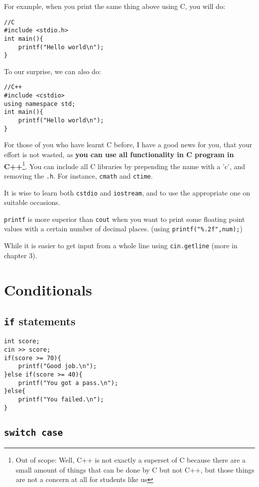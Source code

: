 For example, when you print the same thing above using C, you will do:

\begin{lstlisting}
//C
#include <stdio.h> 
int main(){
    printf("Hello world\n");
}
\end{lstlisting}

To our surprise, we can also do:

\begin{lstlisting}
//C++
#include <cstdio>
using namespace std;
int main(){
    printf("Hello world\n");
}
\end{lstlisting}

For those of you who have learnt C before, I have a good news for you, that your effort is not wasted, as \textbf{you can use all functionality in C program in C++}\footnote{Out of scope: Well, C++ is not exactly a superset of C because there are a small amount of things that can be done by C but not C++, but those things are not a concern at all for students like us}. You can include all C libraries by prepending the name with a 'c', and removing the \texttt{.h}. For instance, \texttt{cmath} and \texttt{ctime}.
\vspace{6mm}

It is wise to learn both \texttt{cstdio} and \texttt{iostream}, and to use the appropriate one on suitable occasions.

\texttt{printf} is more superior than \texttt{cout} when you want to print some floating point values with a certain number of decimal places. (using \texttt{printf("\%.2f",num);})

While it is easier to get input from a whole line using \texttt{cin.getline} (more in chapter 3).

\section{Conditionals}
\subsection{\texttt{if} statements}

\begin{lstlisting}
int score;
cin >> score;
if(score >= 70){
    printf("Good job.\n");
}else if(score >= 40){
    printf("You got a pass.\n");
}else{
    printf("You failed.\n");
}
\end{lstlisting}

\subsection{\texttt{switch case}}

